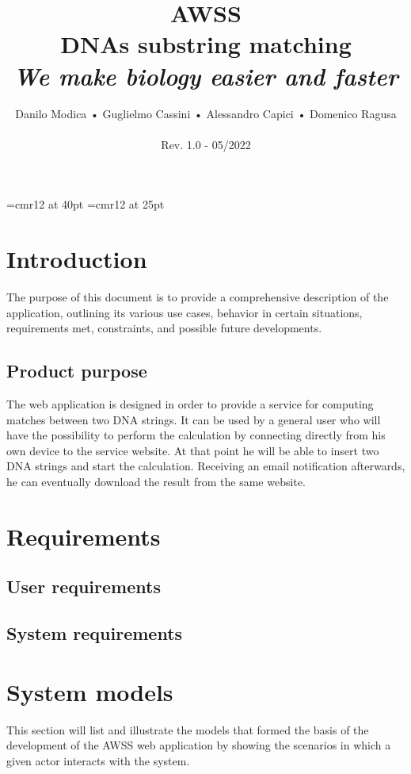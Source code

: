 \documentclass[a4paper,10pt, titlepage]{article}
\begin{document}
\font\myfont=cmr12 at 40pt
\font\myfontok=cmr12 at 25pt

\title{%
  \textbf{\myfont AWSS} \\
  \myfontok DNAs substring matching\\
  	\textit{We make biology easier and faster}}

\author{Danilo Modica • Guglielmo Cassini • Alessandro Capici • Domenico Ragusa\\
		\\
		\footnotesize Rev. 1.0 - 05/2022}
\date{}
\maketitle

\clearpage
\tableofcontents

\clearpage
\setcounter{page}{1}

\section{Introduction}
The purpose of this document is to provide a comprehensive description of the application, outlining its various use cases, behavior in certain situations, requirements met, constraints, and possible future developments.
\subsection{Product purpose}
The web application is designed in order to provide a service for computing matches between two DNA strings. It can be used by a general user who will have the possibility to perform the calculation by connecting directly from his own device to the service website. At that point he will be able to insert two DNA strings and start the calculation. Receiving an email notification afterwards, he can eventually download the result from the same website. 
\section{Requirements}
\subsection{User requirements}
\subsection{System requirements}
\section{System models}
This section will list and illustrate the models that formed the basis of the development of the AWSS web application by showing the scenarios in which a given actor interacts with the system.
\end{document}
